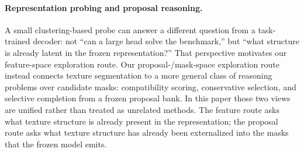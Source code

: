 \paragraph{Representation probing and proposal reasoning.} A small clustering-based probe can answer a different question from a task-trained decoder: not ``can a large head solve the benchmark,'' but ``what structure is already latent in the frozen representation?'' That perspective motivates our feature-space exploration route. Our proposal-/mask-space exploration route instead connects texture segmentation to a more general class of reasoning problems over candidate masks: compatibility scoring, conservative selection, and selective completion from a frozen proposal bank. In this paper those two views are unified rather than treated as unrelated methods. The feature route asks what texture structure is already present in the representation; the proposal route asks what texture structure has already been externalized into the masks that the frozen model emits.

